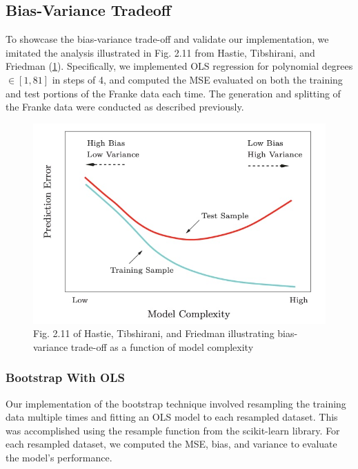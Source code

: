 \documentclass[aps,pra,english,notitlepage,reprint,nofootinbib]{revtex4-1}  %
\begin{document}
\subsection{Bias-Variance Tradeoff} 
To showcase the bias-variance trade-off and validate our implementation, we imitated the analysis illustrated in Fig. 2.11 from Hastie, Tibshirani, and Friedman (\cref{fig:Hastie}). Specifically, we implemented OLS regression for polynomial degrees $\in[1,81]$ in steps of 4, and computed the MSE evaluated on both the training and test portions of the Franke data each time. The generation and splitting of the Franke data were conducted as described previously. \\

\begin{figure}[h!]
  \centering %
  \includegraphics[width=\columnwidth]{../figs/hastie_bias_variance_tradeoff.jpg}
  \caption{Fig. 2.11 of Hastie, Tibshirani, and Friedman illustrating bias-variance trade-off as a function of model complexity \cite{ESL}}\label{fig:Hastie}
\end{figure}

\subsubsection{Bootstrap With OLS}
Our implementation of the bootstrap technique involved resampling the training data multiple times and fitting an OLS model to each resampled dataset. This was accomplished using the resample function from the scikit-learn library. For each resampled dataset, we computed the MSE, bias, and variance to evaluate the model's performance.
\end{document}
